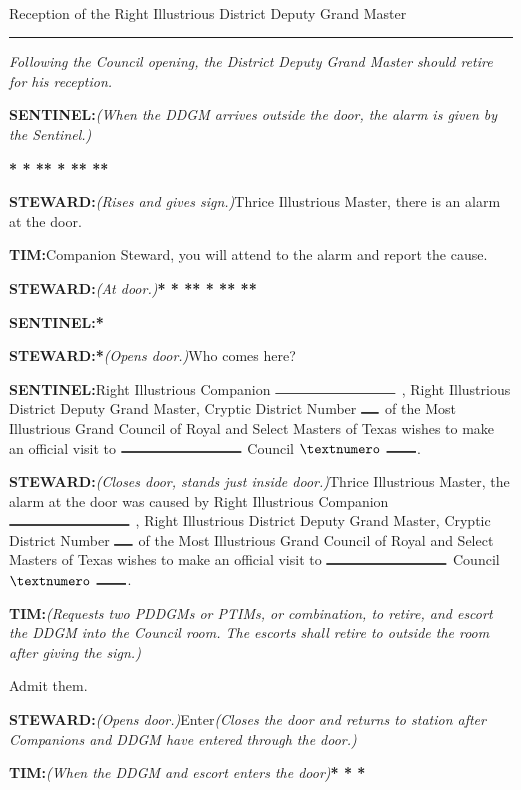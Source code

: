 \documentclass[letterpaper]{article}
\newcommand{\tridot}{\raisebox{0.3ex}{\textbf{{\small$\pmb{\boldsymbol{\therefore}}$}}}}
\newcommand{\smallspace}{\hspace{0.5ex}}
\newcommand{\blank}[1]{$\rule{#1ex}{1pt}$}
\newcommand{\tab}{\hspace{3ex}}
\newcommand{\knock}{\textbf{* * *\tab{}* * *\tab{}* *\tab{}*}}
\newcommand{\sent}{{\color{eggplant}\textbf{SENTINEL:}}\tab{}}
\newcommand{\stew}{{\color{eggplant}\textbf{STEWARD:}}\tab{}}
\newcommand{\tim}{{\color{eggplant}\textbf{T\smallspace{}\tridot{}\smallspace{}I\smallspace{}\tridot{}\smallspace{}M\smallspace{}\tridot{}\smallspace{}:}}\tab{}}
\begin{document}
		\begin{center}
			\phantom{2em}\\
			\vspace{0.5em}
			{\Large Reception of the Right Illustrious District Deputy Grand Master}
		\end{center}
	\rule{\textwidth}{1pt}
	
\emph{Following the Council opening, the District Deputy Grand Master should retire for
	his reception.}

\sent	\emph{(When the DDGM arrives outside the door, the alarm is
	given by the Sentinel.)}

\hspace{19ex}\knock{}

\stew \textit{(Rises and gives sign.)}\tab{}Thrice Illustrious Master, there is an alarm at the door.

\tim Companion Steward, you will attend to the alarm and report the cause.

\stew \emph{(At door.)}\tab{}\knock{}

\sent \textbf{*}

\stew \textbf{*}\tab{}\textit{(Opens door.)}\tab{}Who comes here?

\sent Right Illustrious Companion \blank{20} , Right Illustrious District Deputy Grand Master, Cryptic District Number \blank{3} of the Most Illustrious Grand Council of Royal and Select Masters of Texas wishes to make an official visit to \blank{20} Council $\textnumero$ \blank{5}.


\stew \textit{(Closes door, stands just inside door.)}\tab{}Thrice Illustrious Master, the alarm at the door was caused by Right Illustrious Companion \blank{20} , Right Illustrious District Deputy Grand Master, Cryptic District Number \blank{3} of the Most Illustrious Grand Council of Royal and Select Masters of Texas wishes to make an official visit to \blank{20} Council $\textnumero$ \blank{5}.

\tim \textit{(Requests two PDDGMs or PTIMs, or combination, to retire, and escort the DDGM into the Council room. The escorts shall retire to outside the room after giving the sign.)}

\tab{}\tab{}\tab{}\tab{}\hspace{2ex}\tab{}Admit them.

\stew \textit{(Opens door.)}\tab{}Enter\tab{}\textit{(Closes the door and returns to station after Companions and DDGM have entered through the door.)}

\tim \textit{(When the DDGM and escort enters the door)}\tab{}\textbf{* * *}
\end{document}
